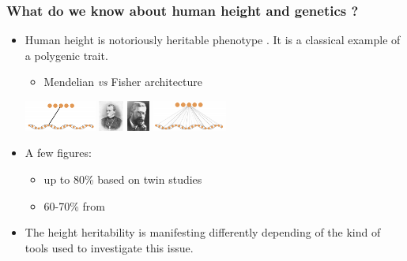 \documentclass[utf8]{beamer}
\begin{document}
\begin{frame}
\frametitle{What do we know about human height and genetics ?}
\begin{itemize}
\item Human height is notoriously heritable phenotype . It is a classical example of a polygenic trait.
\begin{itemize}
\item Mendelian \textit{vs} Fisher architecture
\end{itemize}
\begin{center}
\includegraphics[height=1cm]{mono}
\includegraphics[height=1cm]{mendel}
\includegraphics[height=1cm]{fisher}
\includegraphics[height=1cm]{infinitesimal}\end{center}

\item A few figures:
\begin{itemize}
\item up to 80\% based on twin studies \cite{Yang2010}
\item 60-70\% from \cite{Yang2015}
\end{itemize}


\item The height heritability is manifesting differently depending of the kind of tools used to investigate this issue.
\end{itemize}
\end{frame}

\end{document}
